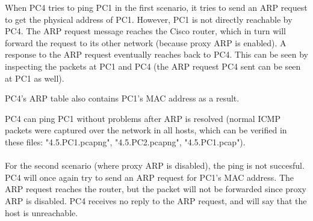 When PC4 tries to ping PC1 in the first scenario, it tries to send an ARP request to get the physical address of PC1. However, PC1 is not directly reachable by PC4. The ARP request message reaches the Cisco router, which in turn will forward the request to its other network (because proxy ARP is enabled). A response to the ARP request eventually reaches back to PC4. This can be seen by inspecting the packets at PC1 and PC4 (the ARP request PC4 sent can be seen at PC1 as well).




PC4's ARP table also contains PC1's MAC address as a result.


PC4 can ping PC1 without problems after ARP is resolved (normal ICMP packets were captured over the network in all hosts, which can be verified in these files: "4.5.PC1.pcapng", "4.5.PC2.pcapng", "4.5.PC1.pcap"). \\ \\
For the second scenario (where proxy ARP is disabled), the ping is not succesful. PC4 will once again try to send an ARP request for PC1's MAC address. The ARP request reaches the router, but the packet will not be forwarded since proxy ARP is disabled. PC4 receives no reply to the ARP request, and will say that the host is unreachable.

